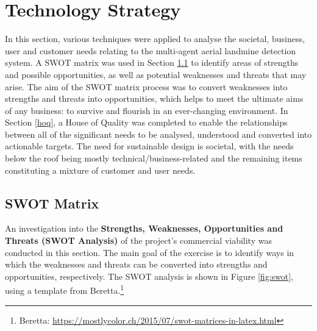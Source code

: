 
\section{Technology Strategy}

In this section, various techniques were applied to analyse the societal, business, user and customer needs relating to the multi-agent aerial landmine detection system. A SWOT matrix was used in Section \ref{sec:swot} to identify areas of strengths and possible opportunities, as well as potential weaknesses and threats that may arise. The aim of the SWOT matrix process was to convert weaknesses into strengths and threats into opportunities, which helps to meet the ultimate aims of any business: to survive and flourish in an ever-changing environment. In Section \ref{hoq}, a House of Quality was completed to enable the relationships between all of the significant needs to be analysed, understood and converted into actionable targets. The need for sustainable design is societal, with the needs below the roof being mostly technical/business-related and the remaining items constituting a mixture of customer and user needs. 


\subsection{SWOT Matrix}
\label{sec:swot}

An investigation into the \textbf{Strengths, Weaknesses, Opportunities and Threats (SWOT Analysis)} of the project's commercial viability was conducted in this section. The main goal of the exercise is to identify ways in which the weaknesses and threats can be converted into strengths and opportunities, respectively. The SWOT analysis is shown in Figure \ref{fig:swot}, using a template from Beretta.\footnote{Beretta: \url{https://mostlycolor.ch/2015/07/swot-matrices-in-latex.html}}

